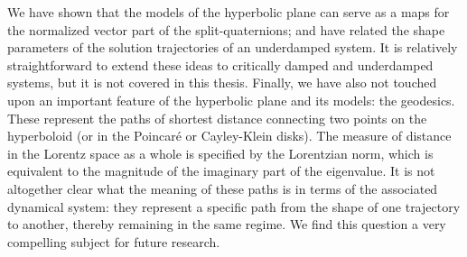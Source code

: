 We have shown that the models of the hyperbolic plane can serve as a maps for the normalized vector part of the split-quaternions; and have related the shape parameters of the solution trajectories of an underdamped system. It is relatively straightforward to extend these ideas to critically damped and underdamped systems, but it is not covered in this thesis. Finally, we have also not touched upon an important feature of the hyperbolic plane and its models: the geodesics. These represent the paths of shortest distance connecting two points on the hyperboloid (or in the Poincaré or Cayley-Klein disks).  The measure of distance in the Lorentz space as a whole is specified by the Lorentzian norm, which is equivalent to the magnitude of the imaginary part of the eigenvalue. It is not altogether clear what the meaning of these paths is in terms of the associated dynamical system: they represent a specific path from the shape of one trajectory to another, thereby remaining in the same regime. We find this question a very compelling subject for future research.

